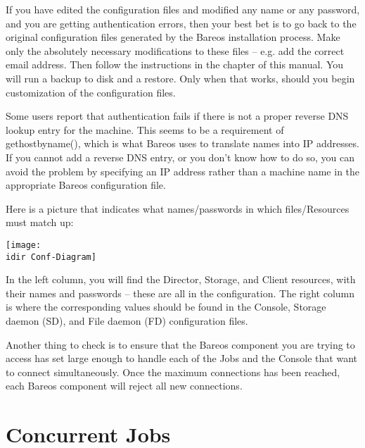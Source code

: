    If you have edited the configuration files and modified any name or any password,
   and you are getting authentication errors, then your best bet is to go
   back to the original configuration files generated by the Bareos installation
   process.  Make only the absolutely necessary modifications to these
   files -- e.g.  add the correct email address.  Then follow the
   instructions in the  chapter of
   this manual.  You will run a backup to disk and a restore.  Only when
   that works, should you begin customization of the configuration files.

   Some users report that authentication fails if there is not a proper
   reverse DNS lookup entry for the machine.  This seems to be a
   requirement of gethostbyname(), which is what Bareos uses to translate
   names into IP addresses.  If you cannot add a reverse DNS entry, or you
   don't know how to do so, you can avoid the problem by specifying an IP
   address rather than a machine name in the appropriate Bareos configuration file.

   Here is a picture that indicates what names/passwords in which
   files/Resources must match up:

   \begin{center}
   \texttt{[image: \\idir Conf-Diagram]}
   \end{center}

   In the left column, you will find the Director, Storage, and  Client
   resources, with their names and passwords -- these  are all in the
   \bareosDir configuration.
   The right column is where the corresponding values
   should be found in the  Console, Storage daemon (SD), and File daemon (FD)
   configuration  files.  

   Another thing to check is to ensure that the Bareos component you are
   trying to access has  set large enough to
   handle each of the Jobs and the Console that want to connect
   simultaneously.  Once the maximum connections has been reached, each
   Bareos component will reject all new connections.

\section{Concurrent Jobs}
\label{ConcurrentJobs}

